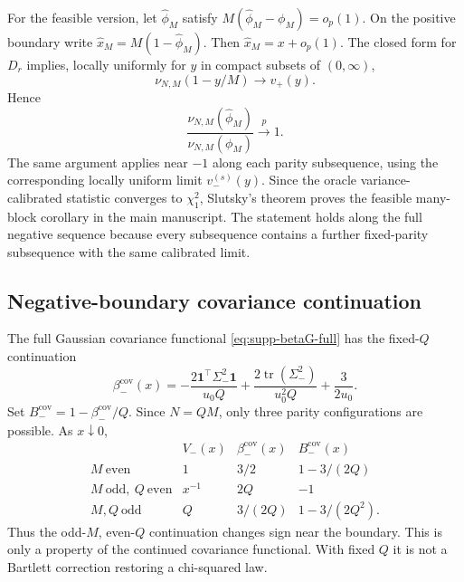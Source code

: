 \documentclass[12pt]{article}
\theoremstyle{remark}
\begin{document}
For the feasible version, let $\widehat\phi_M$ satisfy
$M(\widehat\phi_M-\phi_M)=o_p(1)$. On the positive boundary write
$\widehat x_M=M(1-\widehat\phi_M)$. Then
$\widehat x_M=x+o_p(1)$. The closed form for $D_r$ implies, locally
uniformly for $y$ in compact subsets of $(0,\infty)$,
\[
\nu_{N,M}(1-y/M)\longrightarrow v_+(y).
\]
Hence
\[
\frac{\nu_{N,M}(\widehat\phi_M)}
{\nu_{N,M}(\phi_M)}
\xrightarrow{p}1.
\]
The same argument applies near $-1$ along each parity subsequence, using
the corresponding locally uniform limit $v_-^{(s)}(y)$. Since the oracle
variance-calibrated statistic converges to $\chi_1^2$, Slutsky's theorem
proves the feasible many-block corollary in the main manuscript. The statement holds along
the full negative sequence because every subsequence contains a further
fixed-parity subsequence with the same calibrated limit.

\subsection{Negative-boundary covariance continuation}
The full Gaussian covariance functional \eqref{eq:supp-betaG-full} has the fixed-$Q$ continuation
\begin{equation*}
\beta_-^{\mathrm{cov}}(x)
=-\frac{2\mathbf1^\top\Sigma_-^2\mathbf1}{u_0Q}
+\frac{2\operatorname{tr}(\Sigma_-^2)}{u_0^2Q}
+\frac{3}{2u_0}.
\end{equation*}
Set $B_-^{\mathrm{cov}}=1-\beta_-^{\mathrm{cov}}/Q$. Since $N=QM$, only three parity configurations are possible. As $x\downarrow0$,
\[
\begin{array}{c|ccc}
&V_-(x)&\beta_-^{\mathrm{cov}}(x)&B_-^{\mathrm{cov}}(x)\\ \hline
M\ \mathrm{even}&1&3/2&1-3/(2Q)\\
M\ \mathrm{odd},\ Q\ \mathrm{even}&x^{-1}&2Q&-1\\
M,Q\ \mathrm{odd}&Q&3/(2Q)&1-3/(2Q^2).
\end{array}
\]
Thus the odd-$M$, even-$Q$ continuation changes sign near the boundary. This is only a property of the continued covariance functional. With fixed $Q$ it is not a Bartlett correction restoring a chi-squared law.
\end{document}
